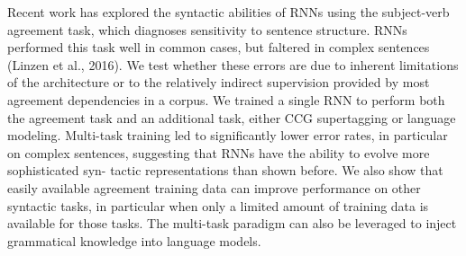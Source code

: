 Recent work has explored the syntactic abilities of RNNs using the subject-verb agreement task, which diagnoses sensitivity to sentence structure. RNNs performed this task well in common cases, but faltered in complex sentences (Linzen et al., 2016). We test whether these errors are due to inherent limitations of the architecture or to the relatively indirect supervision provided by most agreement dependencies in a corpus. We trained a single RNN to perform both the agreement task and an additional task, either CCG supertagging or language modeling. Multi-task training led to significantly lower error rates, in particular on complex sentences, suggesting that RNNs have the ability to evolve more sophisticated syn- tactic representations than shown before. We also show that easily available agreement training data can improve performance on other syntactic tasks, in particular when only a limited amount of training data is available for those tasks. The multi-task paradigm can also be leveraged to inject grammatical knowledge into language models.
